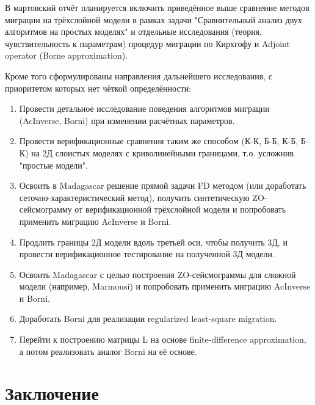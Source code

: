 \documentclass{article}
\begin{document}
В мартовский отчёт планируется включить приведённое выше сравнение методов миграции на трёхслойной модели в рамках задачи "Сравнительный анализ двух алгоритмов на простых моделях" и отдельные исследования (теория, чувствительность к параметрам) процедур миграции по Кирхгофу и Adjoint operator (Borne approximation).

Кроме того сформулированы направления дальнейшего исследования, с приоритетом которых нет чёткой определённости: 

\begin{enumerate}
\item Провести детальное исследование поведения алгоритмов миграции (AcInverse, Borni) при изменении расчётных параметров.
\item Провести верификационные сравнения таким же способом (К-К, Б-Б, К-Б, Б-К) на 2Д слоистых моделях с криволинейными границами, т.о. усложнив "простые модели".
\item Освоить в Madagascar решение прямой задачи FD методом (или доработать сеточно-характеристический метод), получить синтетическую ZO-сейсмограмму от верификационной трёхслойной модели и попробовать применить миграцию AcInverse и Borni.
\item Продлить границы 2Д модели вдоль третьей оси, чтобы получить 3Д, и провести верификационное тестирование на полученной 3Д модели.
\item Освоить Madagascar с целью построения ZO-сейсмограммы для сложной модели (например, Marmousi) и попробовать применить миграцию AcInverse и Borni.
\item Доработать Borni для реализации regularized least-square migration.
\item Перейти к построению матрицы L на основе finite-difference approximation, а потом реализовать аналог Borni на её основе.
\end{enumerate}

\section{Заключение}



\end{document}

